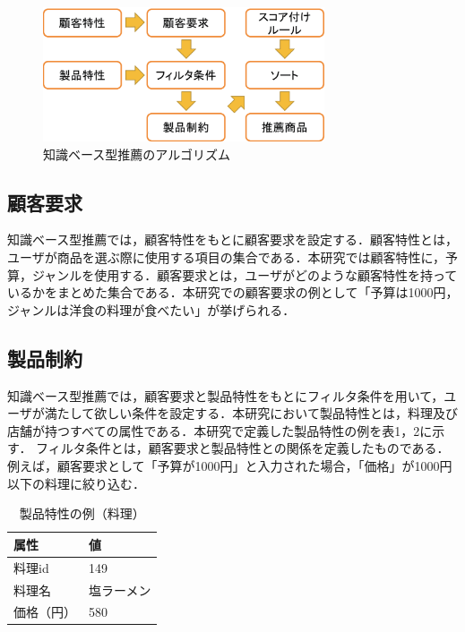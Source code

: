 \documentclass{funthesis}
\begin{document}
\begin{figure}
  \begin{center}
    \includegraphics[clip,width=8.3cm]{model.eps}
    \caption{知識ベース型推薦のアルゴリズム}
  \end{center}
\end{figure}

\subsection{顧客要求}
知識ベース型推薦では，顧客特性をもとに顧客要求を設定する．顧客特性とは，ユーザが商品を選ぶ際に使用する項目の集合である．本研究では顧客特性に，予算，ジャンルを使用する．顧客要求とは，ユーザがどのような顧客特性を持っているかをまとめた集合である．本研究での顧客要求の例として「予算は1000円，ジャンルは洋食の料理が食べたい」が挙げられる．

\subsection{製品制約}
知識ベース型推薦では，顧客要求と製品特性をもとにフィルタ条件を用いて，ユーザが満たして欲しい条件を設定する．本研究において製品特性とは，料理及び店舗が持つすべての属性である．本研究で定義した製品特性の例を表1，2に示す．
フィルタ条件とは，顧客要求と製品特性との関係を定義したものである．例えば，顧客要求として「予算が1000円」と入力された場合，「価格」が1000円以下の料理に絞り込む．

\begin{table}
  \begin{center}
  \scriptsize
    \caption{製品特性の例（料理）}
    \begin{tabular}{p{3.6cm}|p{3.6cm}} 
    \hline
属性 & 値 \\ \hline\hline
      料理id & 149\\ \hline
      料理名 & 塩ラーメン \\ \hline
      価格（円） & 580 \\ \hline  \end{tabular}
  \end{center}
  \end{table}
  
\end{document}
